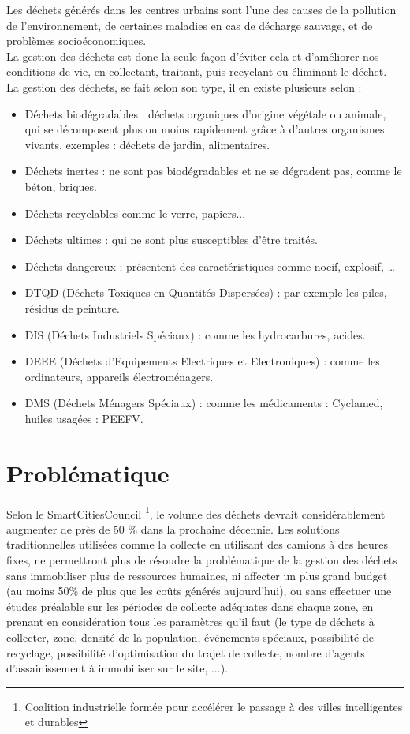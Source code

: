 \documentclass[a4paper,12pt]{report}
\begin{document}
Les déchets générés dans les centres urbains sont l’une des causes de la pollution de l’environnement,  de certaines maladies en cas de décharge sauvage, et de problèmes socioéconomiques.\\
La gestion des déchets est donc la seule façon d’éviter cela et d’améliorer nos conditions de vie, en collectant, traitant, puis recyclant ou éliminant le déchet.\\
La gestion des déchets, se fait selon son type, il en existe plusieurs selon \cite{ref1}: 
\begin{itemize}
\item Déchets biodégradables : déchets organiques d’origine végétale ou animale, qui se décomposent plus ou moins rapidement grâce à d’autres organismes vivants. exemples : déchets de jardin, alimentaires.
\item Déchets inertes : ne sont pas biodégradables et ne se dégradent pas, comme le béton, briques.
\item Déchets recyclables comme le verre, papiers...
\item Déchets ultimes : qui ne sont plus susceptibles d’être traités.
\item Déchets dangereux : présentent des caractéristiques comme nocif, explosif, …
\item DTQD (Déchets Toxiques en Quantités Dispersées) : par exemple les piles, résidus de peinture.
\item DIS (Déchets Industriels Spéciaux) : comme les hydrocarbures, acides.
\item DEEE (Déchets d’Equipements Electriques et Electroniques) : comme les ordinateurs, appareils électroménagers.
\item DMS (Déchets Ménagers Spéciaux) : comme les médicaments : Cyclamed, huiles usagées : PEEFV.
\end{itemize}







\section{Problématique}


Selon le SmartCitiesCouncil \footnote{Coalition industrielle formée pour accélérer le passage à des villes intelligentes et durables}, le volume des déchets devrait considérablement augmenter de près de 50 \% dans la prochaine décennie. Les solutions traditionnelles utilisées comme la collecte en utilisant des camions à des heures fixes, ne permettront plus de résoudre la problématique de la gestion des déchets sans immobiliser plus de ressources humaines, ni affecter un plus grand budget (au moins 50\% de plus que les coûts générés aujourd'hui), ou sans effectuer une études préalable sur les périodes de collecte adéquates dans chaque zone, en prenant en considération tous les paramètres qu'il faut (le type de déchets à collecter, zone, densité de la population, événements spéciaux, possibilité de recyclage, possibilité d'optimisation du trajet de collecte, nombre d'agents d'assainissement à immobiliser sur le site, ...).
\end{document}
